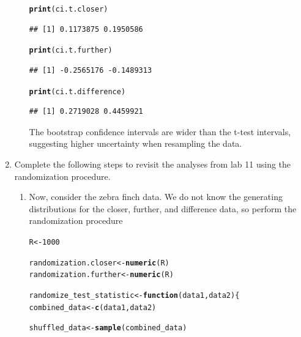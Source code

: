 \documentclass{article}\usepackage[]{graphicx}\usepackage[]{xcolor}
\makeatletter
\newcommand{\hlnum}[1]{\textcolor[rgb]{0.686,0.059,0.569}{#1}}%
\newcommand{\hldef}[1]{\textcolor[rgb]{0.345,0.345,0.345}{#1}}%
\newcommand{\hlkwa}[1]{\textcolor[rgb]{0.161,0.373,0.58}{\textbf{#1}}}%
\newcommand{\hlkwb}[1]{\textcolor[rgb]{0.69,0.353,0.396}{#1}}%
\newcommand{\hlkwc}[1]{\textcolor[rgb]{0.333,0.667,0.333}{#1}}%
\newcommand{\hlkwd}[1]{\textcolor[rgb]{0.737,0.353,0.396}{\textbf{#1}}}%
\newenvironment{kframe}{%
 \def\at@end@of@kframe{}%
 \ifinner\ifhmode%
  \def\at@end@of@kframe{\end{minipage}}%
  \begin{minipage}{\columnwidth}%
 \fi\fi%
 \def\FrameCommand##1{\hskip\@totalleftmargin \hskip-\fboxsep
 \colorbox{shadecolor}{##1}\hskip-\fboxsep
     \hskip-\linewidth \hskip-\@totalleftmargin \hskip\columnwidth}%
 \MakeFramed {\advance\hsize-\width
   \@totalleftmargin\z@ \linewidth\hsize
   \@setminipage}}%
 {\par\unskip\endMakeFramed%
 \at@end@of@kframe}
\newenvironment{knitrout}{}{} %
\makeatother
\begin{document}
\begin{enumerate}
\begin{enumerate}
\begin{knitrout}
\begin{kframe}
\begin{alltt}
\hlkwd{print}\hldef{(ci.t.closer)}
\end{alltt}
\begin{verbatim}
## [1] 0.1173875 0.1950586
\end{verbatim}
\begin{alltt}
\hlkwd{print}\hldef{(ci.t.further)}
\end{alltt}
\begin{verbatim}
## [1] -0.2565176 -0.1489313
\end{verbatim}
\begin{alltt}
\hlkwd{print}\hldef{(ci.t.difference)}
\end{alltt}
\begin{verbatim}
## [1] 0.2719028 0.4459921
\end{verbatim}
\end{kframe}
\end{knitrout}
  The bootstrap confidence intervals are wider than the t-test intervals, suggesting higher uncertainty when resampling the data. 
\end{enumerate}
\item Complete the following steps to revisit the analyses from lab 11 using the
randomization procedure.
\begin{enumerate}
\item Now, consider the zebra finch data. We do not know the generating distributions
for the closer, further, and difference data, so perform the randomization procedure
\begin{knitrout}
\color{fgcolor}\begin{kframe}
\begin{alltt}
\hldef{R} \hlkwb{<-} \hlnum{1000}

\hldef{randomization.closer} \hlkwb{<-} \hlkwd{numeric}\hldef{(R)}
\hldef{randomization.further} \hlkwb{<-} \hlkwd{numeric}\hldef{(R)}

\hldef{randomize_test_statistic} \hlkwb{<-} \hlkwa{function}\hldef{(}\hlkwc{data1}\hldef{,} \hlkwc{data2}\hldef{) \{}
  \hldef{combined_data} \hlkwb{<-} \hlkwd{c}\hldef{(data1, data2)}

  \hldef{shuffled_data} \hlkwb{<-} \hlkwd{sample}\hldef{(combined_data)}


\end{alltt}
\end{kframe}
\end{knitrout}
\end{enumerate}
\end{enumerate}
\end{document}
